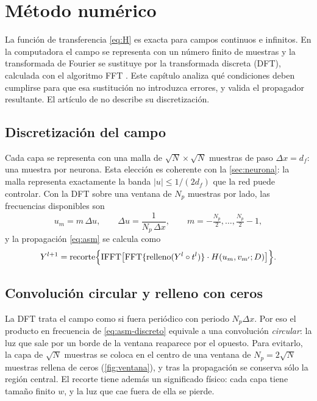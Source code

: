 \chapter{Método numérico}\label{cap:numerico}

La función de transferencia \eqref{eq:H} es exacta para campos continuos e infinitos. En la
computadora el campo se representa con un número finito de muestras y la transformada de
Fourier se sustituye por la transformada discreta (DFT), calculada con el algoritmo FFT
\parencite{cooley1965}. Este capítulo analiza qué condiciones deben cumplirse para que esa
sustitución no introduzca errores, y valida el propagador resultante. El artículo de
\textcite{chen2021} no describe su discretización.

\section{Discretización del campo}\label{sec:discretizacion}

Cada capa se representa con una malla de $\sqrt N\times\sqrt N$ muestras de paso
$\Delta x=d_f$: una muestra por neurona. Esta elección es coherente con la
\cref{sec:neurona}: la malla representa exactamente la banda $|u|\le1/(2d_f)$ que la red puede
controlar. Con la DFT sobre una ventana de $N_p$ muestras por lado, las frecuencias
disponibles son
\begin{equation}
  u_m=m\,\Delta u,\qquad \Delta u=\frac{1}{N_p\,\Delta x},\qquad
  m=-\tfrac{N_p}{2},\dots,\tfrac{N_p}{2}-1 ,
  \label{eq:frecuencias}
\end{equation}
y la propagación \eqref{eq:asm} se calcula como
\begin{equation}
  Y^{l+1}=\mathrm{recorte}\Bigl\{\mathrm{IFFT}\bigl[\mathrm{FFT}\{\mathrm{relleno}(Y^l\circ t^l)\}\cdot H(u_m,v_{m'};D)\bigr]\Bigr\}.
  \label{eq:asm-discreto}
\end{equation}

\section{Convolución circular y relleno con ceros}\label{sec:relleno}

La DFT trata el campo como si fuera periódico con periodo $N_p\Delta x$. Por eso el producto
en frecuencia de \eqref{eq:asm-discreto} equivale a una convolución \emph{circular}: la luz
que sale por un borde de la ventana reaparece por el opuesto. Para evitarlo, la capa de
$\sqrt N$ muestras se coloca en el centro de una ventana de $N_p=2\sqrt N$ muestras rellena de
ceros (\cref{fig:ventana}), y tras la propagación se conserva sólo la región central. El
recorte tiene además un significado físico: cada capa tiene tamaño finito $w$, y la luz que
cae fuera de ella se pierde.

